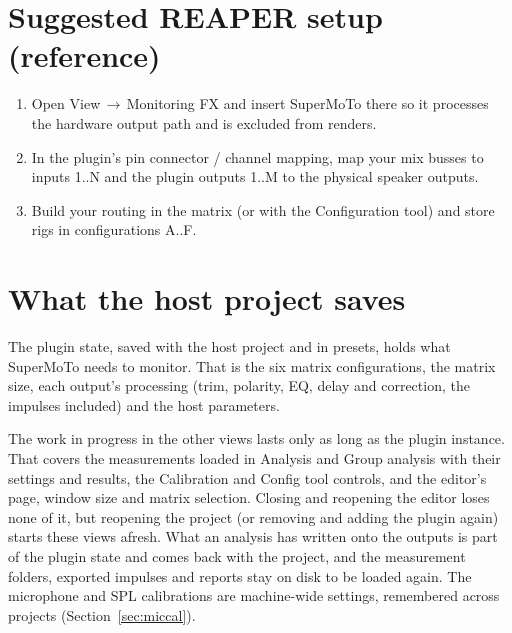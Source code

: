 \section{Suggested REAPER setup (reference)}
\begin{enumerate}[nosep]
  \item Open \textsf{View\,$\rightarrow$\,Monitoring FX} and insert SuperMoTo
        there so it processes the hardware output path and is excluded from
        renders.
  \item In the plugin's pin connector / channel mapping, map your mix busses
        to inputs 1..N and the plugin outputs 1..M to the physical speaker
        outputs.
  \item Build your routing in the matrix (or with the Configuration tool) and
        store rigs in configurations A..F.
\end{enumerate}


\section{What the host project saves}\label{sec:projectstate}
The plugin state, saved with the host project and in presets, holds what SuperMoTo needs to monitor. That is the six matrix configurations, the matrix size, each output's processing (trim, polarity, EQ, delay and  correction, the impulses included) and the host parameters.

The work in progress in the other views lasts only as long as the plugin instance. That covers the measurements loaded in Analysis and Group analysis with their settings and results, the Calibration and Config tool controls, and the editor's page, window size and matrix selection. Closing and reopening the editor loses none of it, but reopening the project (or removing and adding the plugin again) starts these views afresh. What an analysis has written onto the outputs is part of the plugin state and comes back with the project, and the measurement folders, exported impulses and reports stay on disk to be loaded again. The microphone and SPL calibrations are machine-wide settings, remembered across projects (Section~\ref{sec:miccal}).
